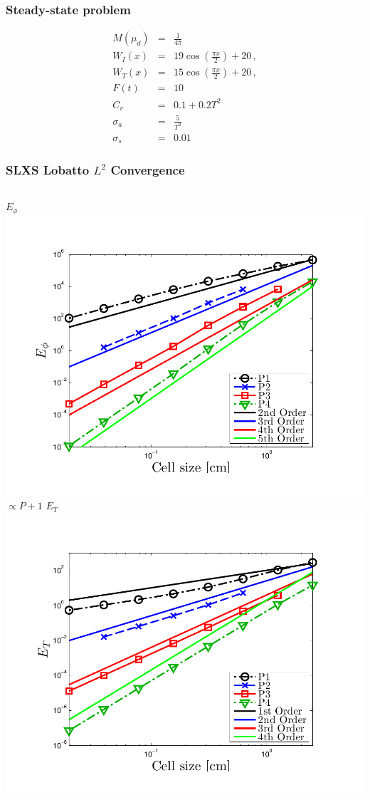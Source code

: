 \documentclass{beamer}
\newcommand{\bea}{\begin{eqnarray*}}  %
\newcommand{\eea}{\end{eqnarray*}}
\newcommand{\pec}{\, ,}
\begin{document}
\begin{frame}
\frametitle{Steady-state problem}
\bea
M(\mu_d) &=& \frac{1}{4\pi} \\
W_I(x) &=& 19 \cos\left( \frac{\pi x}{2} \right) + 20 \pec \\
W_T(x) &=&  15 \cos\left( \frac{\pi x}{2}  \right) + 20 \pec \\
F(t) &=&  10 \\
C_v &=& 0.1 + 0.2 T^2 \\
\sigma_a &=& \frac{5}{T^2} \\
\sigma_s &=& 0.01 
\eea

\end{frame}

\begin{frame}
\frametitle{SLXS Lobatto $L^2$ Convergence}
\begin{columns}[t]
\centering
$E_{\phi}$
\includegraphics[width=\textwidth,trim=0.25in  0.2in 0.75in 0.5in,clip=true]{../chapter6_grey_radtran/Dissertation_Data/Constant_Time_SLXS_Lobatto_phi_L2.pdf}
\\
$\propto P+1$
\centering
$E_{T}$
\includegraphics[width=\textwidth,trim=0.25in  0.2in 0.75in 0.5in,clip=true]{../chapter6_grey_radtran/Dissertation_Data/Constant_Time_SLXS_Lobatto_temp_L2.pdf}

\end{columns}
\end{frame}
\end{document}
